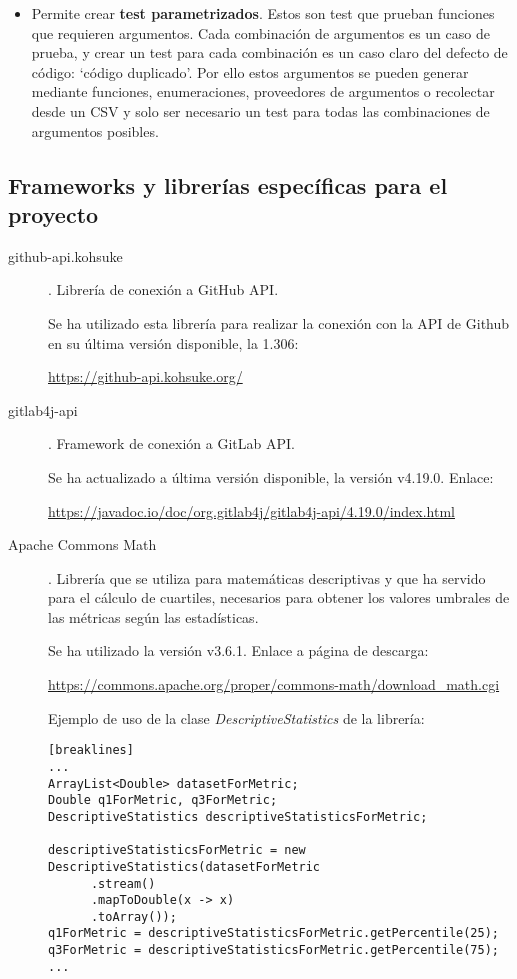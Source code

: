 \begin{description}
\begin{itemize}
			\item Permite crear \textbf{test parametrizados}. Estos son test que prueban funciones que requieren argumentos. Cada combinación de argumentos es un caso de prueba, y crear un test para cada combinación es un caso claro del defecto de código: `código duplicado'. Por ello estos argumentos se pueden generar mediante funciones, enumeraciones, proveedores de argumentos o recolectar desde un CSV y solo ser necesario un test para todas las combinaciones de argumentos posibles.
		\end{itemize}
\end{description}
\subsection{Frameworks y librerías específicas para el proyecto}
\begin{description}
	\item[github-api.kohsuke]. Librería de conexión a GitHub API. 
	
		Se ha utilizado esta librería para realizar la conexión con la API de Github en su última versión disponible, la 1.306:
		
		\url{https://github-api.kohsuke.org/}
		
		
	\item[gitlab4j-api]. Framework de conexión a GitLab API. 
	
		Se ha actualizado a última versión disponible, la versión  v4.19.0. Enlace:
		
	\url{https://javadoc.io/doc/org.gitlab4j/gitlab4j-api/4.19.0/index.html}
		
		
			
	\item[Apache Commons Math]. Librería que se utiliza para matemáticas descriptivas y que ha servido para el cálculo de cuartiles, necesarios para obtener los valores umbrales de las métricas según las estadísticas. 
	
		Se ha utilizado la versión  v3.6.1. Enlace a página de descarga:
	
		\url{https://commons.apache.org/proper/commons-math/download_math.cgi}
		
		Ejemplo de uso de la clase \textit{DescriptiveStatistics} de la librería:
		
\begin{minipage}{\linewidth}
{\tiny 
\begin{verbatim}[breaklines]
...
ArrayList<Double> datasetForMetric;
Double q1ForMetric, q3ForMetric;
DescriptiveStatistics descriptiveStatisticsForMetric;

descriptiveStatisticsForMetric = new DescriptiveStatistics(datasetForMetric
	  .stream()
	  .mapToDouble(x -> x)
	  .toArray());
q1ForMetric = descriptiveStatisticsForMetric.getPercentile(25);
q3ForMetric = descriptiveStatisticsForMetric.getPercentile(75);
...
\end{verbatim}
}
\end{minipage}		

\end{description}
